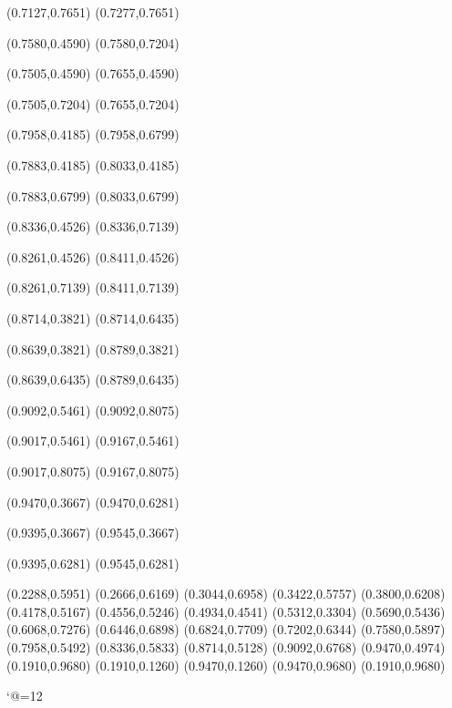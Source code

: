 \PST@Solid(0.7127,0.7651)
(0.7277,0.7651)

\PST@Solid(0.7580,0.4590)
(0.7580,0.7204)

\PST@Solid(0.7505,0.4590)
(0.7655,0.4590)

\PST@Solid(0.7505,0.7204)
(0.7655,0.7204)

\PST@Solid(0.7958,0.4185)
(0.7958,0.6799)

\PST@Solid(0.7883,0.4185)
(0.8033,0.4185)

\PST@Solid(0.7883,0.6799)
(0.8033,0.6799)

\PST@Solid(0.8336,0.4526)
(0.8336,0.7139)

\PST@Solid(0.8261,0.4526)
(0.8411,0.4526)

\PST@Solid(0.8261,0.7139)
(0.8411,0.7139)

\PST@Solid(0.8714,0.3821)
(0.8714,0.6435)

\PST@Solid(0.8639,0.3821)
(0.8789,0.3821)

\PST@Solid(0.8639,0.6435)
(0.8789,0.6435)

\PST@Solid(0.9092,0.5461)
(0.9092,0.8075)

\PST@Solid(0.9017,0.5461)
(0.9167,0.5461)

\PST@Solid(0.9017,0.8075)
(0.9167,0.8075)

\PST@Solid(0.9470,0.3667)
(0.9470,0.6281)

\PST@Solid(0.9395,0.3667)
(0.9545,0.3667)

\PST@Solid(0.9395,0.6281)
(0.9545,0.6281)

\PST@Diamond(0.2288,0.5951)
\PST@Diamond(0.2666,0.6169)
\PST@Diamond(0.3044,0.6958)
\PST@Diamond(0.3422,0.5757)
\PST@Diamond(0.3800,0.6208)
\PST@Diamond(0.4178,0.5167)
\PST@Diamond(0.4556,0.5246)
\PST@Diamond(0.4934,0.4541)
\PST@Diamond(0.5312,0.3304)
\PST@Diamond(0.5690,0.5436)
\PST@Diamond(0.6068,0.7276)
\PST@Diamond(0.6446,0.6898)
\PST@Diamond(0.6824,0.7709)
\PST@Diamond(0.7202,0.6344)
\PST@Diamond(0.7580,0.5897)
\PST@Diamond(0.7958,0.5492)
\PST@Diamond(0.8336,0.5833)
\PST@Diamond(0.8714,0.5128)
\PST@Diamond(0.9092,0.6768)
\PST@Diamond(0.9470,0.4974)
\PST@Border(0.1910,0.9680)
(0.1910,0.1260)
(0.9470,0.1260)
(0.9470,0.9680)
(0.1910,0.9680)

\catcode`@=12
\fi
\endpspicture
